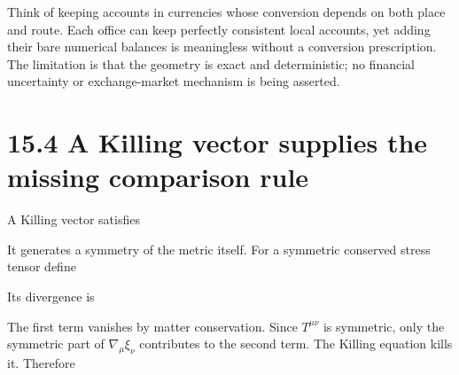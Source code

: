 \documentclass[
  11pt,
  letterpaper,
  oneside,
  openany]{scrbook}
\begin{document}
Think of keeping accounts in currencies whose conversion depends on both
place and route. Each office can keep perfectly consistent local
accounts, yet adding their bare numerical balances is meaningless
without a conversion prescription. The limitation is that the geometry
is exact and deterministic; no financial uncertainty or exchange-market
mechanism is being asserted.

\hypertarget{a-killing-vector-supplies-the-missing-comparison-rule}{%
\section{15.4 A Killing vector supplies the missing comparison
rule}\label{a-killing-vector-supplies-the-missing-comparison-rule}}

A Killing vector satisfies

\begin{center}
\begingroup
{}
\ifdim\wd\grmathbox>\linewidth
\resizebox{\linewidth}{!}{\usebox{\grmathbox}}
\else\usebox{\grmathbox}\fi
\endgroup
\end{center}

It generates a symmetry of the metric itself. For a symmetric conserved
stress tensor define

\begin{center}
\begingroup
{}
\ifdim\wd\grmathbox>\linewidth
\resizebox{\linewidth}{!}{\usebox{\grmathbox}}
\else\usebox{\grmathbox}\fi
\endgroup
\end{center}

Its divergence is

\begin{center}
\begingroup
{}
\ifdim\wd\grmathbox>\linewidth
\resizebox{\linewidth}{!}{\usebox{\grmathbox}}
\else\usebox{\grmathbox}\fi
\endgroup
\end{center}

The first term vanishes by matter conservation. Since \(T^{\mu\nu}\) is
symmetric, only the symmetric part of \(\nabla_\mu\xi_\nu\) contributes
to the second term. The Killing equation kills it. Therefore
\end{document}
